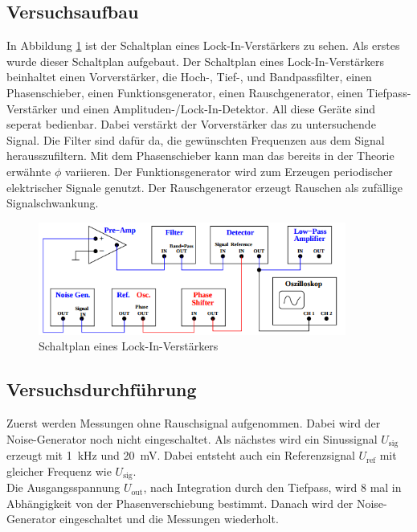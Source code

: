 \documentclass[
  bibliography=totoc,     %
  captions=tableheading,  %
  titlepage=firstiscover, %
]{scrartcl}
\begin{document}
\subsection{Versuchsaufbau}
\label{sec:aufbau}
In Abbildung \ref{fig:V3031} ist der Schaltplan eines Lock-In-Verstärkers zu
sehen. Als erstes wurde dieser Schaltplan aufgebaut. Der Schaltplan eines
Lock-In-Verstärkers beinhaltet einen Vorverstärker, die Hoch-, Tief-, und
Bandpassfilter, einen Phasenschieber, einen Funktionsgenerator, einen Rauschgenerator,
einen Tiefpass-Verstärker und einen Amplituden-/Lock-In-Detektor.
All diese Geräte sind seperat bedienbar. Dabei verstärkt der Vorverstärker das
zu untersuchende Signal. Die Filter sind dafür da, die gewünschten Frequenzen
aus dem Signal herausszufiltern. Mit dem Phasenschieber kann man das bereits in
der Theorie erwähnte $\phi$ variieren. Der Funktionsgenerator wird zum Erzeugen
periodischer elektrischer Signale genutzt. Der Rauschgenerator erzeugt Rauschen
als zufällige Signalschwankung.
\begin{figure}[htb]
  \centering
  \includegraphics[width=0.9\textwidth]{V3031.png}
  \caption{Schaltplan eines Lock-In-Verstärkers \cite{anleitung}}
  \label{fig:V3031}
\end{figure}
\subsection{Versuchsdurchführung}
\label{sec:versuchsdurchführung}
Zuerst werden Messungen ohne Rauschsignal aufgenommen. Dabei wird der
Noise-Generator noch nicht eingeschaltet. Als nächstes wird ein Sinussignal $U_\mathup{sig}$
erzeugt mit \SI{1}{kHz} und \SI{20}{mV}. Dabei entsteht auch ein Referenzsignal
$U_\mathup{ref}$ mit gleicher Frequenz wie $U_\mathup{sig}$.\\ Die Ausgangsspannung $U_\mathup{out}$,
nach Integration durch den Tiefpass, wird 8 mal in Abhängigkeit von der Phasenverschiebung
bestimmt. Danach wird der Noise-Generator eingeschaltet und die Messungen wiederholt.
\end{document}
